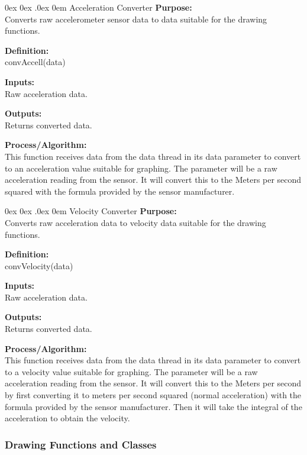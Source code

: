 \documentclass[10pt,draftclsnofoot,onecolumn,compsoc]{IEEEtran}
\makeatletter
\renewcommand\paragraph{\@startsection{paragraph}{4}{\z@}%
                                    {0ex \@plus0ex \@minus.0ex}%
                                    {0em}%
                                    {\normalfont\normalsize\bfseries}}
\makeatother
\begin{document}
\paragraph{Acceleration Converter}
{\bf Purpose:} \\
Converts raw accelerometer sensor data to data suitable for the drawing functions.  \par
{\bf Definition:} \\ 
convAccell(data) \par
{\bf Inputs:} \\ Raw acceleration data. \par
{\bf Outputs:} \\ Returns converted data. \par
{\bf Process/Algorithm:} \\
This function receives data from the data thread in its data parameter to convert to an acceleration value suitable for graphing. The parameter will be a raw acceleration reading from the sensor. It will convert this to the Meters per second squared with the formula provided by the sensor manufacturer. \par

\paragraph{Velocity Converter}
{\bf Purpose:} \\
Converts raw acceleration data to velocity data suitable for the drawing functions.  \par
{\bf Definition:} \\ 
convVelocity(data) \par
{\bf Inputs:} \\ Raw acceleration data. \par
{\bf Outputs:} \\ Returns converted data. \par
{\bf Process/Algorithm:} \\
This function receives data from the data thread in its data parameter to convert to a velocity value suitable for graphing. The parameter will be a raw acceleration reading from the sensor. It will convert this to the Meters per second by first converting it to meters per second squared (normal acceleration) with the formula provided by the sensor manufacturer. Then it will take the integral of the acceleration to obtain the velocity.\par

\subsubsection{Drawing Functions and Classes}\
\end{document}
